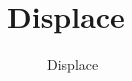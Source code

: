 ﻿




\FloatBarrier
\section{
Displace
}\label{c000015s000013}


\begin{figure}[htb] %
\marginnote{\setlength\fboxsep{2pt}\fbox{\footnotesize{\kaishu\figurename\,}\footnotesize{\ref{p000029}}}}\centering %
\setlength\fboxsep{-1pt} %
\caption{Displace} %
\label{p000029} %
\end{figure}


